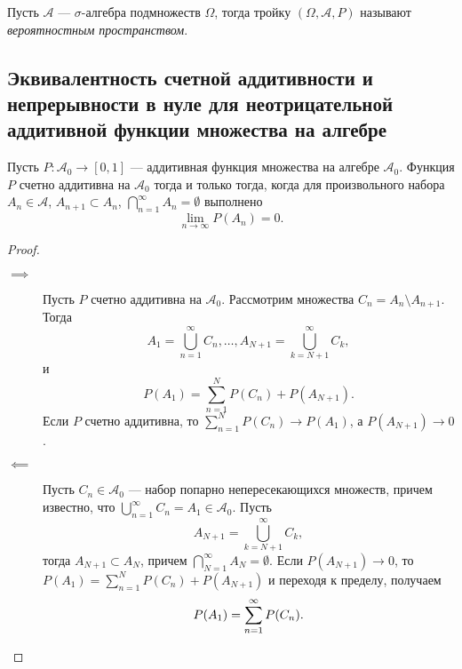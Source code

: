 \begin{definition}
    Пусть $\mathcal{A}$ --- $\sigma$-алгебра подмножеств $\Omega$, тогда тройку $(\Omega, \mathcal{A}, P)$ называют {\it вероятностным пространством}.
\end{definition}

\sectionbreak
\subsection{Эквивалентность счетной аддитивности и непрерывности в нуле для неотрицательной аддитивной функции множества на алгебре}

\begin{proposal*}
    Пусть $P \colon \mathcal{A}_0 \to [0, 1]$ --- аддитивная функция множества на алгебре $\mathcal{A}_0$.
    Функция $P$ счетно аддитивна на $\mathcal{A}_0$ тогда и только тогда, когда для произвольного набора $A_n \in \mathcal{A}$, $A_{n + 1}\subset A_n$, $\bigcap\limits_{n = 1}^\infty A_n = \emptyset$ выполнено
    \[
        \lim\limits_{n \to \infty}P(A_n) = 0.
    \]
\end{proposal*}

\begin{proof}~
    \begin{description}
        \item[$\implies$] Пусть $P$ счетно аддитивна на $\mathcal{A}_0$.
        Рассмотрим множества $C_n = A_n \setminus A_{n + 1}$.
        Тогда
        \[
            A_1 = \bigcup\limits_{n = 1}^\infty C_n, \ldots, A_{N + 1} = \bigcup\limits_{k = N + 1}^{\infty} C_k,
        \]
        и
        \[
            P(A_1) = \sum\limits_{n = 1}^N P(C_n) + P(A_{N + 1}).
        \]
        Если $P$ счетно аддитивна, то $\sum\limits_{n = 1}^N P(C_n) \to P(A_1)$, а $P(A_{N + 1}) \to 0$.
        \item[$\impliedby$] Пусть $C_n \in \mathcal{A}_0$ --- набор попарно непересекающихся множеств, причем известно, что $\bigcup\limits_{n = 1}^\infty C_n = A_1 \in \mathcal{A}_0$.
        Пусть
        \[
            A_{N + 1} = \bigcup\limits_{k = N + 1}^{\infty} C_k,
        \]
        тогда $A_{N + 1} \subset A_N$, причем $\bigcap\limits_{N = 1}^\infty A_N = \emptyset$.
        Если $P(A_{N+1})\to 0$, то $P(A_1)=\sum\limits_{n=1}^N P(C_n) + P(A_{N+1})$ и переходя к пределу, получаем
        \[
            P(A_1) = \sum\limits_{n = 1}^\infty P(C_n). \qedhere
        \]
    \end{description}
\end{proof}

